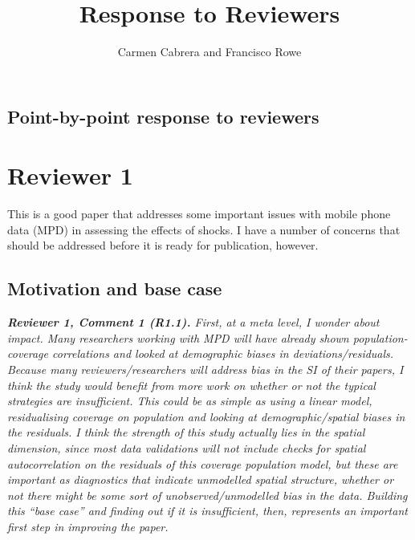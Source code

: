 \documentclass[
  letterpaper,
  DIV=11,
  numbers=noendperiod]{scrartcl}
\title{Response to Reviewers}
\author{Carmen Cabrera and Francisco Rowe}
\date{}
\begin{document}
\maketitle


\subsection{Point-by-point response to
reviewers}\label{point-by-point-response-to-reviewers}

\section{Reviewer 1}

\setlength{\leftskip}{0cm}This is a good paper that addresses some
important issues with mobile phone data (MPD) in assessing the effects
of shocks. I have a number of concerns that should be addressed before
it is ready for publication, however.

\subsection{Motivation and base case}

\setlength{\leftskip}{0cm}\textit{\textbf{Reviewer 1, Comment 1 (R1.1).} First, at a meta level, I wonder about impact. Many researchers working with MPD will have already shown population-coverage correlations and looked at demographic biases in deviations/residuals. Because many reviewers/researchers will address bias in the SI of their papers, I think the study would benefit from more work on whether or not the typical strategies are insufficient. This could be as simple as using a linear model, residualising coverage on population and looking at demographic/spatial biases in the residuals. I think the strength of this study actually lies in the spatial dimension, since most data validations will not include checks for spatial autocorrelation on the residuals of this coverage  population model, but these are important as diagnostics that indicate unmodelled spatial structure, whether or not there might be some sort of unobserved/unmodelled bias in the data. Building this ``base case'' and finding out if it is insufficient, then, represents an important first step in improving the paper.}
\end{document}
